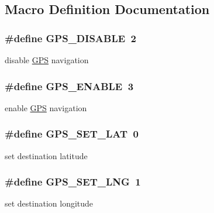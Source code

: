 \subsection{Macro Definition Documentation}
\hypertarget{group__gps__commands_ga8e394314aacedb0790203d4af6cd5710}{
\subsubsection[{G\-P\-S\-\_\-\-D\-I\-S\-A\-B\-L\-E}]{\setlength{\rightskip}{0pt plus 5cm}\#define G\-P\-S\-\_\-\-D\-I\-S\-A\-B\-L\-E~2}}\label{group__gps__commands_ga8e394314aacedb0790203d4af6cd5710}
disable \hyperlink{classGPS}{G\-P\-S} navigation \hypertarget{group__gps__commands_gac8383d8fc4fa97bb45f89d9a50e0966d}{
\subsubsection[{G\-P\-S\-\_\-\-E\-N\-A\-B\-L\-E}]{\setlength{\rightskip}{0pt plus 5cm}\#define G\-P\-S\-\_\-\-E\-N\-A\-B\-L\-E~3}}\label{group__gps__commands_gac8383d8fc4fa97bb45f89d9a50e0966d}
enable \hyperlink{classGPS}{G\-P\-S} navigation \hypertarget{group__gps__commands_gaac31d4fc4681381604fdbf78b5aa7599}{
\subsubsection[{G\-P\-S\-\_\-\-S\-E\-T\-\_\-\-L\-A\-T}]{\setlength{\rightskip}{0pt plus 5cm}\#define G\-P\-S\-\_\-\-S\-E\-T\-\_\-\-L\-A\-T~0}}\label{group__gps__commands_gaac31d4fc4681381604fdbf78b5aa7599}
set destination latitude \hypertarget{group__gps__commands_gafe7ed49e1848a16fd15d1643b4c4c36b}{
\subsubsection[{G\-P\-S\-\_\-\-S\-E\-T\-\_\-\-L\-N\-G}]{\setlength{\rightskip}{0pt plus 5cm}\#define G\-P\-S\-\_\-\-S\-E\-T\-\_\-\-L\-N\-G~1}}\label{group__gps__commands_gafe7ed49e1848a16fd15d1643b4c4c36b}
set destination longitude 
